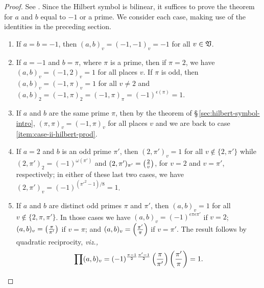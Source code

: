 \begin{proof}
    See \cite[p.~23]{weismann2006annotations}. Since the Hilbert symbol is bilinear, it suffices to prove the theorem for \(a\) and \(b\) equal to \(-1\) or a prime. We consider each case, making use of the identities in the preceding section.

    \smallskip

    \begin{enumerate}[nosep, label=(\roman*), wide]
        \item If \(a = b = -1\), then \((a, b)_v = (-1, -1)_v = -1\) for all \(v \in \mathfrak{V}\).
        \item If \(a = -1\) and \(b = \pi\), where \(\pi\) is a prime, then if \(\pi = 2\), we have \((a, b)_v = (-1, 2)_v = 1\) for all places \(v\). If \(\pi\) is odd, then \((a, b)_v = (-1, \pi)_v = 1\) for all \(v \neq 2\) and \((a, b)_2 = (-1, \pi)_2 = (-1, \pi)_{\pi} = (-1)^{\epsilon(\pi)} = 1\).\label{item:case-ii-hilbert-prod}
        \item If \(a\) and \(b\) are the same prime \(\pi\), then by the theorem of \S\,\ref{sec:hilbert-symbol-intro}, \((\pi, \pi)_v = (-1, \pi)_v\) for all places \(v\) and we are back to case \ref{item:case-ii-hilbert-prod}.
        \item If \(a = 2\) and \(b\) is an odd prime \(\pi'\), then \((2, \pi')_v = 1\) for all \(v \notin \{2, \pi'\}\) while \((2, \pi')_2 = (-1)^{\omega(\pi')}\) and \((2, \pi')_{\pi'} = \left(\frac{2}{v}\right)\), for \(v = 2\) and \(v = \pi'\), respectively; in either of these last two cases, we have \((2, \pi')_v = (-1)^{(\pi'^2 - 1)/8} = 1\).
        \item If \(a\) and \(b\) are distinct odd primes \(\pi\) and \(\pi'\), then \((a,b)_v = 1\) for all \(v \notin \{2, \pi, \pi'\}\). In those cases we have \((a, b)_v = (-1)^{\epsilon{\pi}\epsilon{\pi'}}\) if \(v = 2\); \((a, b)_v = \left(\frac{\pi}{\pi'}\right)\) if \(v = \pi\); and \((a, b)_v = \left(\frac{\pi'}{\pi}\right)\) if \(v = \pi'\). The result follows by quadratic reciprocity, \emph{viz.,}
        \[
            \prod (a, b)_v =  (-1)^{\frac{\pi-1}{2}\frac{\pi'-1}{2}} \left(\frac{\pi}{\pi'}\right) \left(\frac{\pi'}{\pi}\right) = 1.
        \]
    \end{enumerate}
\end{proof}

